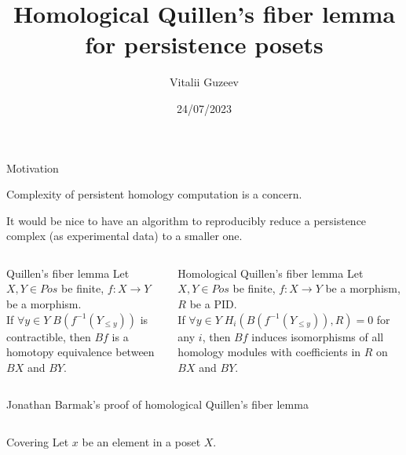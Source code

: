 \documentclass[usenames,dvipsnames]{beamer}
\title[https://arxiv.org/abs/2307.00177]{Homological Quillen's fiber lemma for persistence posets}
\author[viviag@yandex.ru, viviag.io]{Vitalii Guzeev}
\institute[HSE]{HSE faculty of mathematics}
\date{24/07/2023}
\begin{document}
  \begin{frame}{}
    \begin{block}{\large Motivation}
      \centering
      {\normalsize Complexity of persistent homology computation is a concern.\par
      It would be nice to have an algorithm to reproducibly reduce a persistence complex (as experimental data) to a smaller one.}\par
    \end{block}
    \vspace{0.5cm}
    \begin{tcolorbox}[ size=tight,oversize,sharp corners
                     , colback=taspruce,colframe=ta2aluminium,left=56pt,right=90pt,bottom=20pt
                     ]
    \begin{minipage}{0.97\paperwidth}
    \begin{columns}[t]
      \begin{column}{.48\linewidth}
        \begin{block}{Quillen's fiber lemma}
          Let $X, Y \in Pos$ be finite, $f : X \to Y$ be a morphism.\\
    If $\forall y \in Y\;B(f^{-1}(Y_{\leqslant y}))$ is contractible, then $Bf$ is a homotopy equivalence between $BX$ and $BY$.
        \end{block}
      \end{column}
      \begin{column}{.51\linewidth}
        \begin{block}{Homological Quillen's fiber lemma}
          Let $X, Y \in Pos$ be finite, $f : X \to Y$ be a morphism, $R$ be a PID.\\
    If $\forall y \in Y\;H_i(B(f^{-1}(Y_{\leqslant y})),R) = 0$ for any $i$, then $Bf$ induces isomorphisms of all homology modules with coefficients in $R$ on $BX$ and $BY$.
        \end{block}
      \end{column}
    \end{columns}
    \begin{block}{\large Jonathan Barmak's proof of homological Quillen's fiber lemma}
      \begin{minipage}{0.97\linewidth}
      \begin{columns}[t]
      \begin{column}{.27\linewidth}
        \begin{block}{Covering}
          Let $x$ be an element in a poset $X$.\par

\end{block}
\end{column}
\end{columns}
\end{minipage}
\end{block}
\end{minipage}
\end{tcolorbox}
\end{frame}
\end{document}
